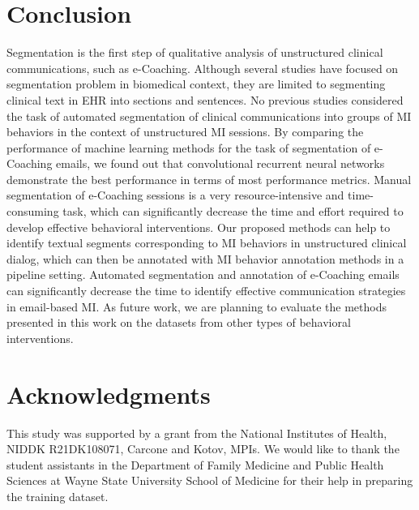\documentclass{amia}
\begin{document}
 
\section*{Conclusion}

Segmentation is the first step of qualitative analysis of unstructured clinical communications, such as e-Coaching. Although several studies have focused on segmentation problem in biomedical context, they are limited to segmenting clinical text in EHR into sections and sentences. No previous studies considered the task of automated segmentation of clinical communications into groups of MI behaviors in the context of unstructured MI sessions. By comparing the performance of machine learning methods for the task of segmentation of e-Coaching emails, we found out that convolutional recurrent neural networks demonstrate the best performance in terms of most performance metrics. Manual segmentation of e-Coaching sessions is a very resource-intensive and time-consuming task, which can significantly decrease the time and effort required to develop effective behavioral interventions. Our proposed methods can help to identify textual segments corresponding to MI behaviors in unstructured clinical dialog, which can then be annotated with MI behavior annotation methods in a pipeline setting. Automated segmentation and annotation of e-Coaching emails can significantly decrease the time to identify effective communication strategies in email-based MI. As future work, we are planning to evaluate the methods presented in this work on the datasets from other types of behavioral interventions.

\section*{Acknowledgments}
This study was supported by a grant from the National Institutes of Health, NIDDK R21DK108071, Carcone and Kotov, MPIs. We would like to thank the student assistants in the Department of Family Medicine and Public Health Sciences at Wayne State University School of Medicine for their help in preparing the training dataset. 



\end{document}
